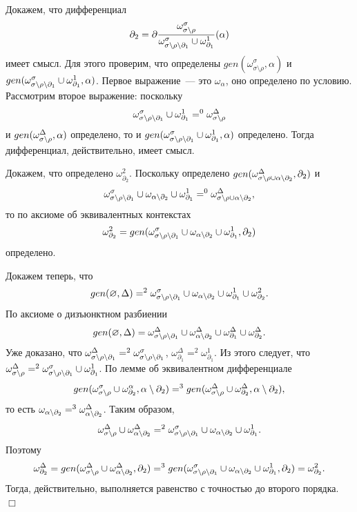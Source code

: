 Докажем, что дифференциал $$\partial_2 = \partial\dfrac{\omega^\sigma_{\sigma\setminus\rho}}{\omega^\sigma_{{\sigma\setminus\rho\setminus\partial_1}} \cup \omega^1_{\partial_1}}(\alpha)$$ 
имеет смысл. Для этого проверим, что определены $gen(\omega^\sigma_{\sigma\setminus\rho}, \alpha)$ и $gen(\omega^\sigma_{{\sigma\setminus\rho\setminus\partial_1}} \cup \omega^1_{\partial_1}, \alpha)$. Первое выражение~--- это $\omega_\alpha$, оно определено по условию. Рассмотрим второе выражение: поскольку $$\omega^\sigma_{{\sigma\setminus\rho\setminus\partial_1}} \cup \omega^1_{\partial_1} =^0 \omega^\Delta_{{\sigma\setminus\rho}}$$ 
и $gen(\omega^\Delta_{{\sigma\setminus\rho}}, \alpha)$ определено, то и $gen(\omega^\sigma_{{\sigma\setminus\rho\setminus\partial_1}} \cup \omega^1_{\partial_1}, \alpha)$ определено. Тогда дифференциал, действительно, имеет смысл.

Докажем, что определено $\omega^2_{\partial_2}$. Поскольку определено $gen(\omega^\Delta_{{\sigma\setminus\rho} \cup {\alpha\setminus{\partial_2}}}, \partial_2)$ и $$\omega^\sigma_{{\sigma\setminus\rho\setminus\partial_1}} \cup \omega_{{\alpha\setminus{\partial_2}}} \cup \omega^1_{\partial_1} =^0 \omega^\Delta_{{\sigma\setminus\rho} \cup {\alpha\setminus{\partial_2}}},$$ то по аксиоме об эквивалентных контекстах $$\omega^2_{\partial_2} = gen(\omega^\sigma_{{\sigma\setminus\rho\setminus\partial_1}} \cup \omega_{{\alpha\setminus{\partial_2}}} \cup \omega^1_{\partial_1}, \partial_2)$$ 
определено.

Докажем теперь, что $$gen(\varnothing, \Delta) =^2 \omega^\sigma_{{\sigma\setminus\rho\setminus\partial_1}} \cup \omega_{{\alpha\setminus{\partial_2}}} \cup \omega^1_{\partial_1} \cup \omega^2_{\partial_2}.$$ 
По аксиоме о дизъюнктном разбиении $$gen(\varnothing, \Delta) = \omega^\Delta_{\sigma\setminus\rho\setminus\partial_1} \cup \omega^\Delta_{\alpha\setminus{\partial_2}} \cup \omega^\Delta_{\partial_1} \cup \omega^\Delta_{\partial_2}.$$ 
Уже доказано, что $\omega^\Delta_{{\sigma\setminus\rho\setminus\partial_1}} =^2 \omega^\sigma_{{\sigma\setminus\rho\setminus\partial_1}}$, $\omega^\Delta_{\partial_1} =^2 \omega^1_{\partial_1}$. Из этого следует, что $\omega^\Delta_{{\sigma\setminus\rho}} =^2 \omega^\sigma_{{\sigma\setminus\rho\setminus\partial_1}} \cup \omega^1_{\partial_1}$. По лемме об эквивалентном дифференциале $$gen(\omega^\sigma_{{\sigma\setminus\rho}} \cup \omega^\alpha_{\partial_2}, {\alpha\setminus{\partial_2}}) =^3 gen(\omega^\Delta_{\sigma\setminus\rho} \cup \omega^\Delta_{\partial_2}, {\alpha\setminus{\partial_2}}),$$ 
то есть $\omega_{{\alpha\setminus{\partial_2}}} =^3 \omega^\Delta_{{\alpha\setminus{\partial_2}}}$. Таким образом, $$\omega^\Delta_{{\sigma\setminus\rho}} \cup \omega^\Delta_{{\alpha\setminus{\partial_2}}} =^2 \omega^\sigma_{{\sigma\setminus\rho\setminus\partial_1}} \cup \omega_{{\alpha\setminus{\partial_2}}} \cup \omega^1_{\partial_1}.$$ 
Поэтому $$\omega^\Delta_{\partial_2} = gen(\omega^\Delta_{{\sigma\setminus\rho}} \cup \omega^\Delta_{{\alpha\setminus{\partial_2}}}, \partial_2) =^3 gen(\omega^\sigma_{{\sigma\setminus\rho\setminus\partial_1}} \cup \omega_{{\alpha\setminus{\partial_2}}} \cup \omega^1_{\partial_1}, \partial_2) = \omega^2_{\partial_2}.$$ 
Тогда, действительно, выполняется равенство с точностью до второго порядка. $\Box$\\
 

